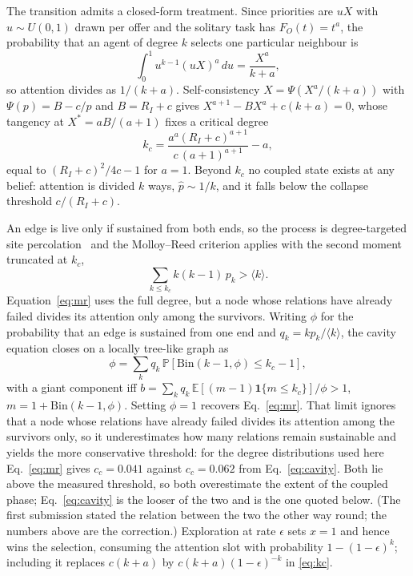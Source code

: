\documentclass[aps,pre,twocolumn,superscriptaddress,floatfix,longbibliography]{revtex4-2}
\begin{document}
The transition admits a closed-form treatment. Since priorities are $uX$ with
$u\sim U(0,1)$ drawn per offer and the solitary task has $F_O(t)=t^{a}$, the
probability that an agent of degree $k$ selects one particular neighbour is
\begin{equation}
  \int_0^1 u^{k-1}(uX)^a\,du = \frac{X^{a}}{k+a},
  \label{eq:select}
\end{equation}
so attention divides as $1/(k+a)$. Self-consistency $X=\Psi(X^a/(k+a))$ with
$\Psi(p)=B-c/p$ and $B=R_I+c$ gives $X^{a+1}-BX^{a}+c(k+a)=0$, whose tangency at
$X^{*}=aB/(a+1)$ fixes a critical degree
\begin{equation}
  k_c=\frac{a^{a}(R_I+c)^{a+1}}{c\,(a+1)^{a+1}}-a ,
  \label{eq:kc}
\end{equation}
equal to $(R_I+c)^2/4c-1$ for $a=1$. Beyond $k_c$ no coupled state exists at any
belief: attention is divided $k$ ways, $\hat p \sim 1/k$, and it falls below the
collapse threshold $c/(R_I+c)$.

An edge is live only if sustained from both ends, so the process is
degree-targeted site percolation~\cite{stauffer1994} and the Molloy--Reed
criterion applies with the
second moment truncated at $k_c$,
\begin{equation}
  \sum_{k\le k_c} k(k-1)\,p_k > \langle k\rangle .
  \label{eq:mr}
\end{equation}
Equation~\eqref{eq:mr} uses the full degree, but a node whose relations have
already failed divides its attention only among the survivors. Writing $\phi$ for
the probability that an edge is sustained from one end and $q_k=kp_k/\langle
k\rangle$, the cavity equation closes on a locally tree-like graph as
\begin{equation}
  \phi=\sum_k q_k\,\mathbb{P}\!\left[\mathrm{Bin}(k-1,\phi)\le k_c-1\right],
  \label{eq:cavity}
\end{equation}
with a giant component iff $b=\sum_k q_k\,\mathbb{E}[(m-1)\mathbf{1}\{m\le
k_c\}]/\phi>1$, $m=1+\mathrm{Bin}(k-1,\phi)$.  Setting $\phi=1$ recovers
Eq.~\eqref{eq:mr}. That limit ignores that a node whose relations have already
failed divides its attention among the survivors only, so it underestimates how
many relations remain sustainable and yields the more conservative threshold: for
the degree distributions used here Eq.~\eqref{eq:mr} gives $c_c=0.041$ against
$c_c=0.062$ from Eq.~\eqref{eq:cavity}. Both lie above the measured threshold, so
both overestimate the extent of the coupled phase; Eq.~\eqref{eq:cavity} is the
looser of the two and is the one quoted below. (The first submission stated the
relation between the two the other way round; the numbers above are the
correction.) Exploration at rate $\epsilon$
sets $x=1$ and hence wins the selection, consuming the attention slot with
probability $1-(1-\epsilon)^k$; including it replaces $c(k+a)$ by
$c(k+a)(1-\epsilon)^{-k}$ in \eqref{eq:kc}.
\end{document}
